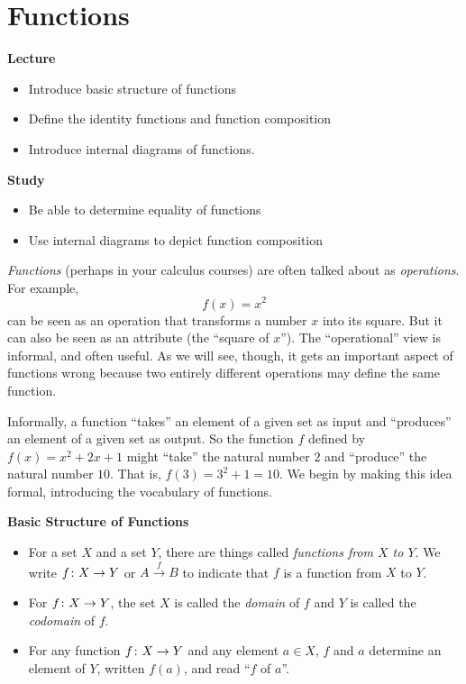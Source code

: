 \chapter{Functions}

\begin{goals}
\noindent\textbf{Lecture}
\begin{itemize}
\item Introduce basic structure of functions
\item Define the identity functions and function composition
\item Introduce internal diagrams of functions.
\end{itemize}

\noindent\textbf{Study}
\begin{itemize}
\item Be able to determine equality of functions
\item Use internal diagrams to depict function composition
\end{itemize}
\end{goals}

\emph{Functions} (perhaps in your calculus courses) are often talked about as \emph{operations}. 
For example, 
\[f(x) = x^2\]
can be seen as an operation that transforms a number $x$ into its square.
But it can also be seen as an attribute (the ``square of $x$'').
The ``operational'' view is informal, and often useful.
As we will see, though, it gets an important aspect of functions wrong because two entirely different operations may define the same function.

Informally, a function ``takes'' an element of a given set as input and ``produces'' an element of  a given set as output.
So the function $f$ defined by $f(x)=x^2 + 2x + 1$ might ``take'' the natural number $2$ and ``produce'' the natural number $10$. 
That is, $f(3)=3^2 + 1 = 10$. 
We begin by making this idea formal, introducing the vocabulary of functions.

\begin{principle}\label{ax:function-sig}
\noindent \textbf{Basic Structure of Functions}

	\begin{itemize}
	\item For a set $X$ and a set $Y$, there are things called \emph{functions from $X$ to $Y$}. We write ${f}\colon{X}\to{Y}$ or $A\stackrel{f}{\to} B$ to indicate that $f$ is a function from $X$ to $Y$. 

	\item For ${f}\colon{X}\to{Y}$, the set $X$ is called the \emph{domain} of $f$ and $Y$ is called the \emph{codomain} of $f$.
	
	\item For any function ${f}\colon{X}\to{Y}$ and any element $a\in X$, $f$ and $a$ determine an element of $Y$, written $f(a)$, and read ``$f$ of $a$''.
	\end{itemize}
\end{principle}

